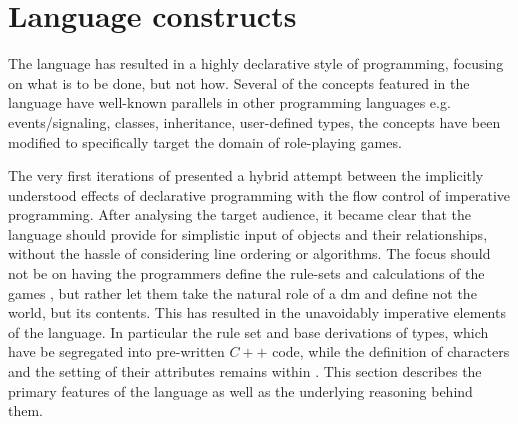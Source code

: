 \section{Language constructs}
The \langname{} language has resulted in a highly declarative style of programming, focusing on what is to be done, but not how. Several of the concepts featured in the language have well-known parallels in other programming languages e.g. events/signaling, classes, inheritance, user-defined types, the concepts have been modified to specifically target the domain of role-playing games.

The very first iterations of \langname{} presented a hybrid attempt between the implicitly understood effects of declarative programming with the flow control of imperative programming. After analysing the target audience, it became clear that the language should provide for simplistic input of objects and their relationships, without the hassle of considering line ordering or algorithms. The focus should not be on having the programmers define the rule-sets and calculations of the games \cite{wod}, but rather let them take the natural role of a \ac{dm} and define not the world, but its contents. This has resulted in the unavoidably imperative elements of the language. In particular the rule set and base derivations of types, which have be segregated into pre-written $C++$ code, while the definition of characters and the setting of their attributes remains within \langname{}. This section describes the primary features of the \langname{} language as well as the underlying reasoning behind them.
